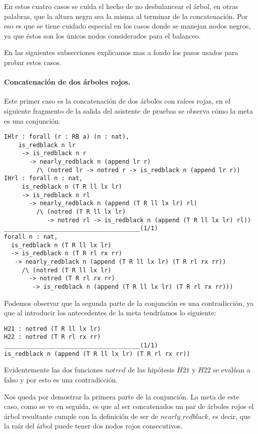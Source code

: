 En estos cuatro casos se cuida el hecho de no desbalancear el \'arbol, en otras palabras, 
que la altura negra sea la misma al terminar de la concatenaci\'on. Por eso es que se tiene cuidado
especial en los casos donde se manejan nodos negros, ya que \'estos son los únicos nodos
considerados para el balanceo.

En las siguientes subsecciones explicamos mas a fondo los pasos usados para probar estos casos.


\paragraph{Concatenaci\'on de dos \'arboles rojos.}

Este primer caso es la concatenaci\'on de dos \'arboles con raíces rojas, en el siguiente
fragmento de la salida del asistente de pruebas se observa c\'omo la meta es una conjunci\'on.

\begin{verbatim}
IHlr : forall (r : RB a) (n : nat),
    is_redblack n lr
     -> is_redblack n r
       -> nearly_redblack n (append lr r)
         /\ (notred lr -> notred r -> is_redblack n (append lr r))
IHrl : forall n : nat,
     is_redblack n (T R ll lx lr)
     -> is_redblack n rl
       -> nearly_redblack n (append (T R ll lx lr) rl)
         /\ (notred (T R ll lx lr)
            -> notred rl -> is_redblack n (append (T R ll lx lr) rl))
______________________________________(1/1)
forall n : nat,
  is_redblack n (T R ll lx lr)
  -> is_redblack n (T R rl rx rr)
   -> nearly_redblack n (append (T R ll lx lr) (T R rl rx rr))
     /\ (notred (T R ll lx lr)
       -> notred (T R rl rx rr)
        -> is_redblack n (append (T R ll lx lr) (T R rl rx rr)))
\end{verbatim}

Podemos observar que la segunda parte de la conjunci\'on es una contradicci\'on, ya que al
introducir los antecedentes de la meta tendríamos lo siguiente:

\begin{verbatim}
H21 : notred (T R ll lx lr)
H22 : notred (T R rl rx rr)
______________________________________(1/1)
is_redblack n (append (T R ll lx lr) (T R rl rx rr))
\end{verbatim}

Evidentemente las dos funciones $notred$ de las hip\'otesis $H21$ y $H22$ se eval\'uan a falso y por
esto es una contradicci\'on.

Nos queda por demostrar la primera parte de la conjunci\'on. La meta de este caso, como se ve en
seguida, es que al ser concatenados un par de \'arboles rojos el árbol resultante cumple con la
definici\'on de ser de \hyperref[inductive_isRedB]{$nearly\_redblack$}, es decir, que la raíz del 
\'arbol puede tener dos nodos rojos consecutivos.

